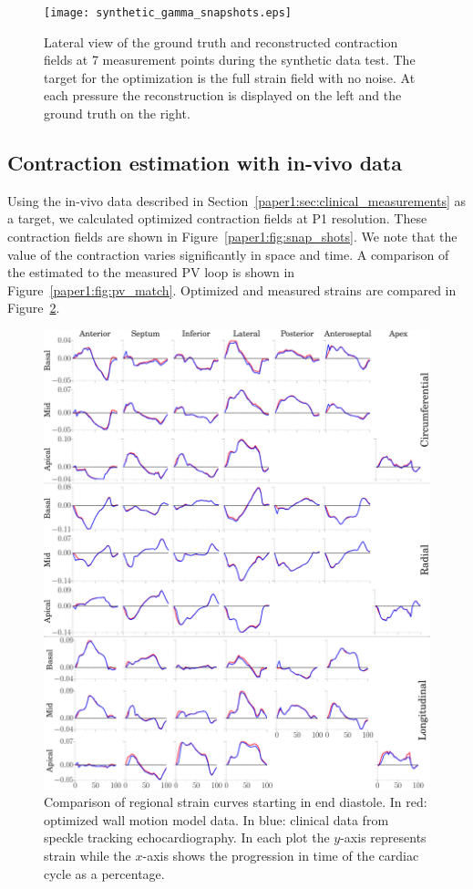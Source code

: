 \begin{figure}[htbp]
 \texttt{[image: synthetic\_gamma\_snapshots.eps]}
 \caption{Lateral view of the ground truth and reconstructed contraction fields at 7 measurement points during
  the synthetic data test. The target for the optimization is the full strain field with no noise.
 At each pressure the reconstruction is displayed on the left and the ground truth on the right.}
\label{paper1:fig:synthetic_gammafields}
 \end{figure}

\subsection{Contraction estimation with in-vivo data}
\label{paper1:sec:results_clinical}

Using the in-vivo data described in
Section~\ref{paper1:sec:clinical_measurements} as a target, we calculated optimized contraction 
fields at P1 resolution. These contraction fields are shown in
Figure~\ref{paper1:fig:snap_shots}. We note that the value of the contraction varies significantly in space and time.
A comparison of the estimated to the measured PV loop is shown in Figure~\ref{paper1:fig:pv_match}. Optimized
and measured strains are compared in Figure~\ref{paper1:fig:strain_match}.

\begin{figure}[htbp]
\centering
  \includegraphics[width=\textwidth]{simulated_strains}
\caption{Comparison of regional strain curves starting in end diastole. In red: optimized wall
  motion model data. In blue: clinical data from speckle tracking
  echocardiography. In each plot the $y$-axis represents strain while
  the $x$-axis shows the progression in time of the cardiac cycle as a
  percentage.}
  \label{paper1:fig:strain_match}
\end{figure}

